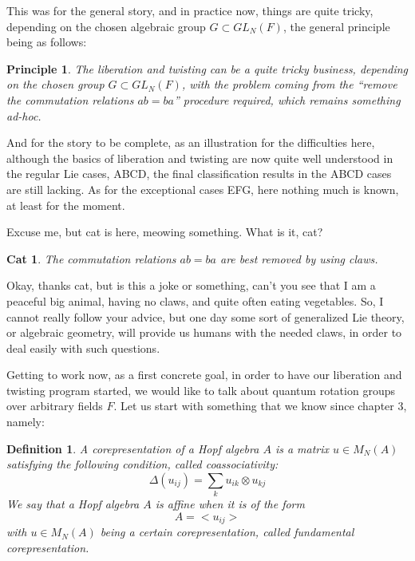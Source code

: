 \documentclass[12pt]{amsbook}
\newtheorem{cat}[theorem]{Cat}
\newtheorem{definition}[theorem]{Definition}
\newtheorem{principle}[theorem]{Principle}
\begin{document}
\bigskip

This was for the general story, and in practice now, things are quite tricky, depending on the chosen algebraic group $G\subset GL_N(F)$, the general principle being as follows:

\begin{principle}
The liberation and twisting can be a quite tricky business, depending on the chosen group $G\subset GL_N(F)$, with the problem coming from the ``remove the commutation relations $ab=ba$'' procedure required, which remains something ad-hoc.
\end{principle}

And for the story to be complete, as an illustration for the difficulties here, although the basics of liberation and twisting are now quite well understood in the regular Lie cases, ABCD, the final classification results in the ABCD cases are still lacking. As for the exceptional cases EFG, here nothing much is known, at least for the moment.

\bigskip

Excuse me, but cat is here, meowing something. What is it, cat?

\begin{cat}
The commutation relations $ab=ba$ are best removed by using claws.
\end{cat}

Okay, thanks cat, but is this a joke or something, can't you see that I am a peaceful big animal, having no claws, and quite often eating vegetables. So, I cannot really follow your advice, but one day some sort of generalized Lie theory, or algebraic geometry, will provide us humans with the needed claws, in order to deal easily with such questions.

\bigskip

Getting to work now, as a first concrete goal, in order to have our liberation and twisting program started, we would like to talk about quantum rotation groups over arbitrary fields $F$. Let us start with something that we know since chapter 3, namely:

\begin{definition}
A corepresentation of a Hopf algebra $A$ is a matrix $u\in M_N(A)$ satisfying the following condition, called coassociativity:
$$\Delta(u_{ij})=\sum_ku_{ik}\otimes u_{kj}$$
We say that a Hopf algebra $A$ is affine when it is of the form
$$A=<u_{ij}>$$
with $u\in M_N(A)$ being a certain corepresentation, called fundamental corepresentation.
\end{definition}
\end{document}

